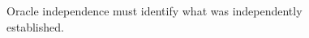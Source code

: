 \begin{figure}[H]
\centering
{}
\caption{Oracle independence must identify what was independently established.}\label{fig:teach-M07-05}
\end{figure}
